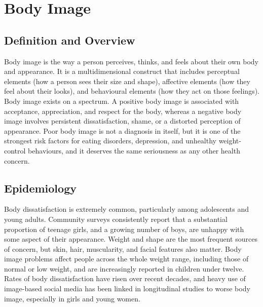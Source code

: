 \chapter{Body Image}

\section*{Definition and Overview}
Body image is the way a person perceives, thinks, and feels about their own body and appearance. It is a multidimensional construct that includes perceptual elements (how a person sees their size and shape), affective elements (how they feel about their looks), and behavioural elements (how they act on those feelings). Body image exists on a spectrum. A positive body image is associated with acceptance, appreciation, and respect for the body, whereas a negative body image involves persistent dissatisfaction, shame, or a distorted perception of appearance. Poor body image is not a diagnosis in itself, but it is one of the strongest risk factors for eating disorders, depression, and unhealthy weight-control behaviours, and it deserves the same seriousness as any other health concern.

\section*{Epidemiology}
Body dissatisfaction is extremely common, particularly among adolescents and young adults. Community surveys consistently report that a substantial proportion of teenage girls, and a growing number of boys, are unhappy with some aspect of their appearance. Weight and shape are the most frequent sources of concern, but skin, hair, muscularity, and facial features also matter. Body image problems affect people across the whole weight range, including those of normal or low weight, and are increasingly reported in children under twelve. Rates of body dissatisfaction have risen over recent decades, and heavy use of image-based social media has been linked in longitudinal studies to worse body image, especially in girls and young women.

